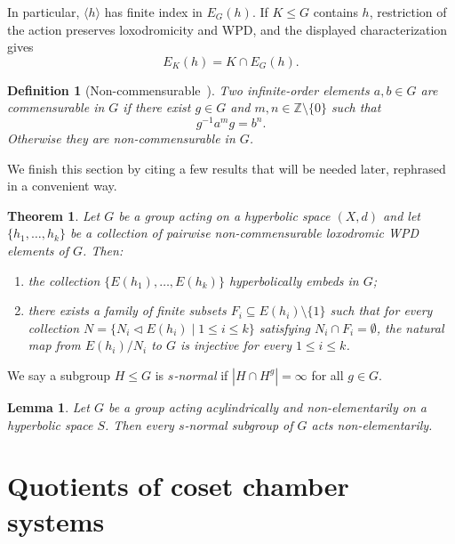 \documentclass[11pt,letterpaper]{amsart}
\newtheorem{thm}[prop]{Theorem}
\newtheorem{lemma}[prop]{Lemma}
\newtheorem{definition}[prop]{Definition}
\newcommand{\ZZ}{\mathbb{Z}}
\begin{document}
In particular, $\langle h\rangle$ has finite index in $E_G(h)$.
If $K\leq G$ contains $h$, restriction of the action preserves
loxodromicity and WPD, and the displayed characterization gives
\[
    E_K(h)=K\cap E_G(h).
\]

\begin{definition}[Non-commensurable~{\cite[Section~2]{hull2017small}}]
\label{def:commensurable}
Two infinite-order elements $a,b\in G$ are \emph{commensurable in $G$} if
there exist $g\in G$ and $m,n\in\ZZ\setminus\{0\}$ such that
\[
    g^{-1}a^m g=b^n.
\]
Otherwise they are \emph{non-commensurable in $G$}.
\end{definition}

We finish this section by citing a few results that will be needed later, rephrased in a convenient way.

\begin{thm}\cite[Theorem 6.8 and Theorem 7.19, adapted]{DGO}\label{thm:DGO_thms}
    Let $G$ be a group acting on a hyperbolic space $(X,d)$ and let $\{h_1,\ldots,h_k\}$ be a collection of pairwise non-commensurable loxodromic WPD elements of $G$. Then:
    \begin{enumerate}
        \item the collection $\{E(h_1),\ldots,E(h_k)\}$ hyperbolically embeds in $G$;
        \item there exists a family of finite subsets $F_i\subseteq E(h_i)\setminus \{1\}$ such that for every collection $N=\{N_i \triangleleft E(h_i)\mid 1\leq i\leq k\}$ satisfying $N_i \cap F_i=\emptyset$, the natural map from $E(h_i)/N_i$ to $G$ is injective for every $1\leq i \leq k$.
    \end{enumerate}
\end{thm}

We say a subgroup $H\leq G$ is \emph{$s$-normal} if $|H\cap H^g|=\infty$ for all $g\in G$.
\begin{lemma}\cite[Lemma 7.1]{OsinAcylindrical}\label{lem:snormal_non_elem}
    Let $G$ be a group acting acylindrically and non-elementarily on a hyperbolic space $S$. Then every $s$-normal subgroup of $G$ acts non-elementarily.
\end{lemma}



\section{Quotients of coset chamber systems} \label{sec:quotientChamberSystems}
\end{document}
